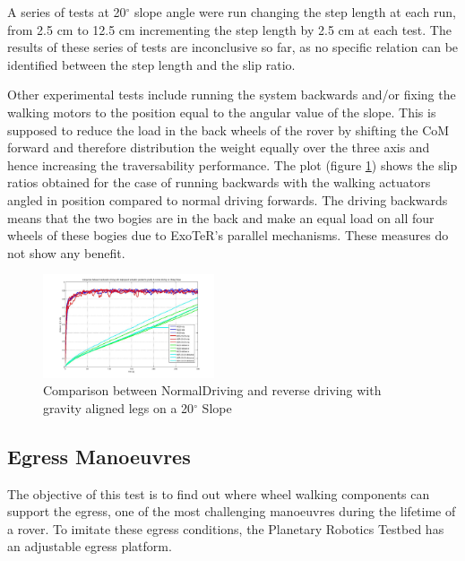 \documentclass[a4paper,twocolumn]{esapub2005} %
\begin{document}
A series of tests at 20$^{\circ}$ slope angle were run changing the step length at each run, from 2.5 cm to 12.5 cm incrementing the step length by 2.5 cm at each test. The results of these series of tests are inconclusive so far, as no specific relation can be identified between the step length and the slip ratio.

Other experimental tests include running the system backwards and/or fixing the walking motors to the position equal to the angular value of the slope. This is supposed to reduce the load in the back wheels of the rover by shifting the CoM forward and therefore distribution the weight equally over the three axis and hence increasing the traversability performance. The plot (figure \ref{fig:ndr20d}) shows the slip ratios obtained for the case of running backwards with the walking actuators angled in position compared to normal driving forwards. The driving backwards means that the two bogies are in the back and make an equal load on all four wheels of these bogies due to ExoTeR's parallel mechanisms.
These measures do not show any benefit.


\begin{figure}[h!]
	\centering		\includegraphics[width=0.45\textwidth]{ndr20d.JPG}	
	\caption{Comparison between NormalDriving and reverse driving with gravity aligned legs on a 20$^{\circ}$ Slope}
	\label{fig:ndr20d}
\end{figure}

\subsection{Egress Manoeuvres}
The objective of this test is to find out where wheel walking components can support the egress, one of the most challenging manoeuvres during the lifetime of a rover. To imitate these egress conditions, the Planetary Robotics Testbed has an adjustable egress platform.
\end{document}
